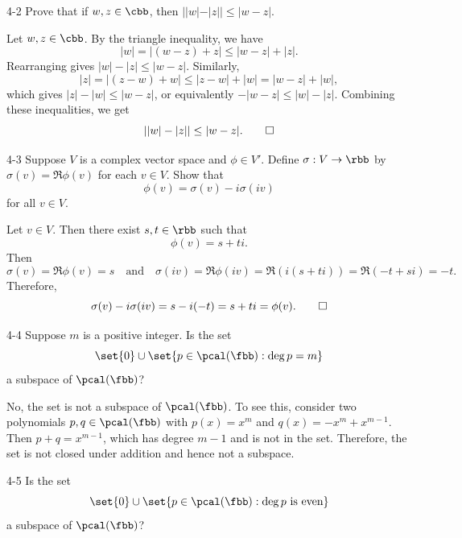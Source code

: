 \begin{exercise}{4-2}
    Prove that if $w, z \in \cbb$, then $||w| - |z|| \leq |w - z|$.
    
\end{exercise}

\begin{sol}
    Let $w, z \in \cbb$.
	By the triangle inequality, we have
    \[
    	|w| = |(w - z) + z| \leq |w - z| + |z|.
    \]
    Rearranging gives $|w| - |z| \leq |w - z|$.
	Similarly,
    \[
    	|z| = |(z - w) + w| \leq |z - w| + |w| = |w - z| + |w|,
    \]
    which gives $|z| - |w| \leq |w - z|$, or equivalently $-|w - z| \leq |w| - |z|$.
	Combining these inequalities, we get
    \[
    	||w| - |z|| \leq |w - z|. \qedhere
    \]
\end{sol}

\begin{exercise}{4-3}
    Suppose $V$ is a complex vector space and $\phi \in V'$.
	Define $\sigma: V \to \rbb$ by $\sigma(v) = \Re \phi(v)$ for each $v \in V$.
	Show that
    \[
    	\phi(v) = \sigma(v) - i\sigma(iv)
    \]
    for all $v \in V$.
\end{exercise}

\begin{sol}
    Let $v \in V$.
	Then there exist $s, t \in \rbb$ such that
    \[
    	\phi(v) = s + ti.
    \]
    Then
    \[
    	\sigma(v) = \Re \phi(v) = s \quad \text{and} \quad \sigma(iv) = \Re \phi(iv) = \Re (i(s + ti)) = \Re (-t + si) = -t.
    \]
    Therefore,
    \[
    	\sigma(v) - i\sigma(iv) = s - i(-t) = s + ti = \phi(v). \qedhere
    \]
\end{sol}

\begin{exercise}{4-4}
    Suppose $m$ is a positive integer.
	Is the set
    \[
    	\set{0} \cup \set{p \in \pcal(\fbb) : \deg p = m}
    \]
    a subspace of $\pcal(\fbb)$?
\end{exercise}

\begin{sol}
    No, the set is not a subspace of $\pcal(\fbb)$.
	To see this, consider two polynomials $p, q \in \pcal(\fbb)$ with $p(x) = x^m$ and $q(x) = -x^m + x^{m - 1}$.
	Then $p + q = x^{m - 1}$, which has degree $m - 1$ and is not in the set.
	Therefore, the set is not closed under addition and hence not a subspace.
\end{sol}

\begin{exercise}{4-5}
    Is the set
    \[
    	\set{0} \cup \set{p \in \pcal(\fbb) : \deg p \text{ is even}}
    \]
    a subspace of $\pcal(\fbb)$?
\end{exercise}

